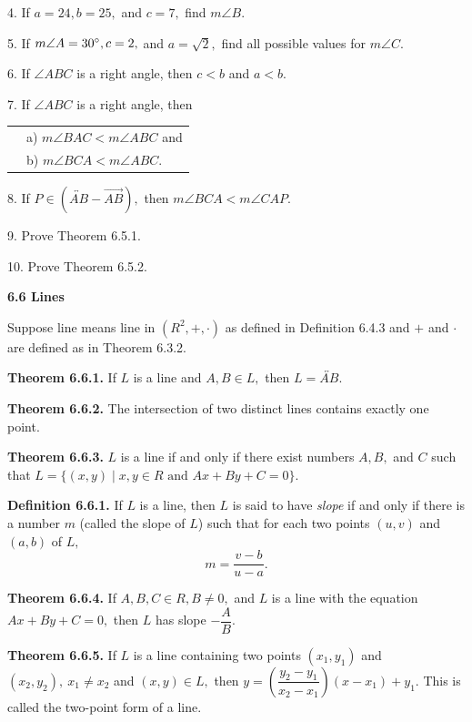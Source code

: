 4. If $a = 24, b = 25,$ and $c = 7,$ find $m\angle B.$\nl

5. If $m\angle A = 30^{\circ}, c = 2,$ and $a = \sqrt{2},$ find all possible values for $m\angle C.$\nl

6. If $\angle ABC$ is a right angle, then $c < b$ and $a < b.$\nl

7. 	If $\angle ABC$ is a right angle, then \nl
\begin{tabular}{r l}
&a) $m\angle BAC < m\angle ABC$ and\\
&b) $m\angle BCA <  m\angle ABC.$\\
\end{tabular}\nl

8. If $P\in(\overleftrightarrow{AB} - \overrightarrow{AB}),$ then $m\angle BCA < m\angle CAP.$ \nl

9. Prove Theorem 6.5.1. \nl

10. Prove Theorem 6.5.2. \nl

\newpage
\textbf{6.6 Lines}\nl

Suppose line means line in $(R^{2},+,\cdot)$ as defined in Definition 6.4.3 and $+$ and $\cdot$ are defined as in Theorem 6.3.2.\nl

\textbf{Theorem 6.6.1.} If $L$ is a line and $A,B\in L,$ then $L = \overleftrightarrow{AB}.$\nl

\textbf{Theorem 6.6.2.} The intersection of two distinct lines contains exactly one point.\nl

\textbf{Theorem 6.6.3.} $L$ is a line if and only if there exist numbers $A, B,$ and $C$ such that $L= \{(x,y) \mid x,y\in R \text{~and~} Ax + By + C= 0\}.$\nl

\textbf{Definition 6.6.1.} If $L$ is a line, then $L$ is said to have \textit{slope} if and only if there is a number $m$ (called the slope of $L$) such that for each two points $(u,v)$ and $(a,b)$ of $L,$
\[
m = \dfrac{v - b}{u - a}.
\]


\textbf{Theorem 6.6.4.} If $A,B,C\in R, B \neq 0,$ and $L$ is a line with the
equation $Ax + By + C = 0,$ then $L$ has slope $-\dfrac{A}{B}.$\nl

\textbf{Theorem 6.6.5.} If $L$ is a line containing two points $(x_{1}, y_{1})$ and $(x_{2}, y_{2}),~x_{1} \neq x_{2}$ and $(x, y) \in L,$ then $y =\left( \dfrac{y_{2} - y_{1}}{x_{2} - x_{1}}\right)(x - x_{1}) + y_{1}.$ This is called the two-point form of a line.\nl

